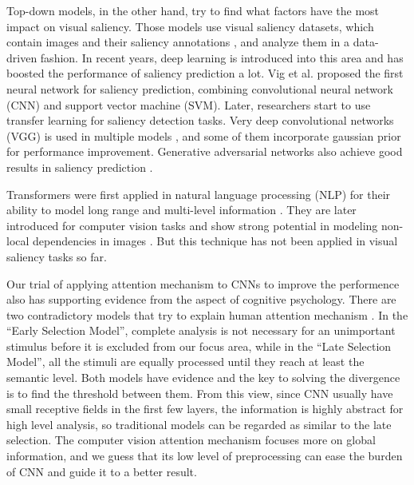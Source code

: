 \documentclass[12pt]{article}
\begin{document}
Top-down models, in the other hand, try to find what factors have the most impact on visual saliency. Those models use visual saliency datasets, which contain images and their saliency annotations
, and analyze them in a data-driven fashion.
In recent years, deep learning is introduced into this area and has boosted the performance of saliency prediction a lot.
Vig et al. \cite{vigLargeScaleOptimizationHierarchical2014} proposed the first neural network for saliency prediction, combining convolutional neural network (CNN) and support vector machine (SVM). Later, researchers start to use transfer learning for saliency 
detection tasks. Very deep convolutional networks (VGG) is used in multiple models \cite{kruthiventiDeepFixFullyConvolutional2015, kummererDeepGazeIIReading2016, corniaPredictingHumanEye2018}, and some of them incorporate gaussian prior for performance improvement.
Generative adversarial networks also achieve good results in saliency prediction \cite{panSalGANVisualSaliency2018, cheHowGazeInfluenced2020}.

Transformers were first applied in natural language processing (NLP) for their ability to model long range and multi-level information \cite{bahdanauNeuralMachineTranslation2016a, vaswaniAttentionAllYou2017a}.
They are later introduced for computer vision tasks and show strong potential in modeling non-local dependencies in images \cite{zhangSelfAttentionGenerativeAdversarial2019a}.
But this technique has not been applied in visual saliency tasks so far.

Our trial of applying attention mechanism to CNNs to improve the performence also has supporting evidence from the aspect of cognitive psychology. There are two contradictory models that try to explain human attention mechanism \cite{gazzaniga2006cognitive}. 
In the “Early Selection Model”, complete analysis is not necessary for an unimportant stimulus before it is excluded from our focus area, while in the “Late Selection Model”, all the stimuli are equally processed until they reach at least the semantic level. 
Both models have evidence and the key to solving the divergence is to find the threshold between them. From this view, since CNN usually have small receptive fields in the first few layers, the information is highly abstract for high level analysis, so traditional models can be regarded as similar to the late selection. 
The computer vision attention mechanism focuses more on global information, and we guess that its low level of preprocessing can ease the burden of CNN and guide it to a better result.
\end{document}
